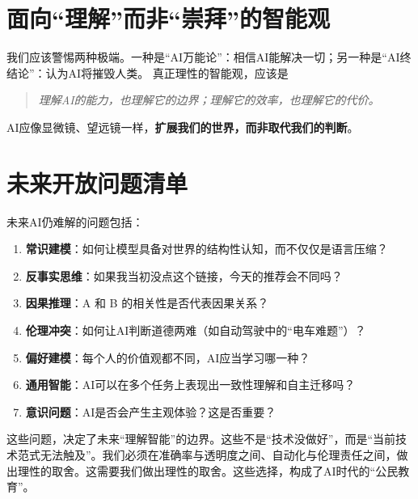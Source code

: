 \section{面向“理解”而非“崇拜”的智能观}

我们应该警惕两种极端。一种是“AI万能论”：相信AI能解决一切；另一种是“AI终结论”：认为AI将摧毁人类。
真正理性的智能观，应该是
\begin{quote}
\textit{理解AI的能力，也理解它的边界；理解它的效率，也理解它的代价。}
\end{quote}
AI应像显微镜、望远镜一样，\textbf{扩展我们的世界，而非取代我们的判断}。
\section{未来开放问题清单}

未来AI仍难解的问题包括：
\begin{enumerate}
\item \textbf{常识建模}：如何让模型具备对世界的结构性认知，而不仅仅是语言压缩？
\item \textbf{反事实思维}：如果我当初没点这个链接，今天的推荐会不同吗？
\item \textbf{因果推理}：A 和 B 的相关性是否代表因果关系？
\item \textbf{伦理冲突}：如何让AI判断道德两难（如自动驾驶中的“电车难题”）？
\item \textbf{偏好建模}：每个人的价值观都不同，AI应当学习哪一种？
\item \textbf{通用智能}：AI可以在多个任务上表现出一致性理解和自主迁移吗？
\item \textbf{意识问题}：AI是否会产生主观体验？这是否重要？
\end{enumerate}
这些问题，决定了未来“理解智能”的边界。这些不是“技术没做好”，而是“当前技术范式无法触及”。我们必须在准确率与透明度之间、自动化与伦理责任之间，做出理性的取舍。这需要我们做出理性的取舍。这些选择，构成了AI时代的“公民教育”。
\nocite{*}
\printbibliography[heading=bibintoc, title=\ebibname]
\newpage
